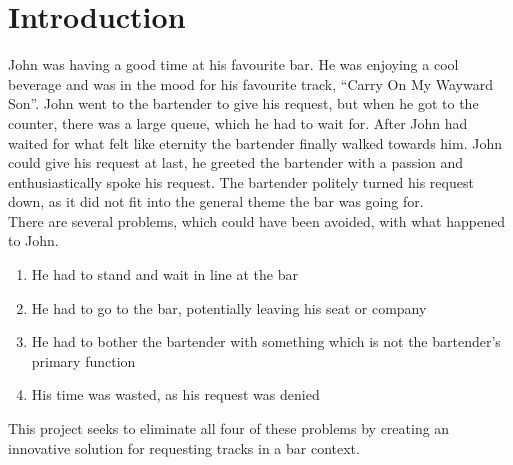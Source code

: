 \chapter{Introduction}
John was having a good time at his favourite bar. He was enjoying a cool beverage and was in the mood for his favourite track, \enquote{Carry On My Wayward Son}. John went to the bartender to give his request, but when he got to the counter, there was a large queue, which he had to wait for. After John had waited for what felt like eternity the bartender finally walked towards him. John could give his request at last, he greeted the bartender with a passion and enthusiastically spoke his request. The bartender politely turned his request down, as it did not fit into the general theme the bar was going for.\\

There are several problems, which could have been avoided, with what happened to John.
\begin{enumerate}
	\item He had to stand and wait in line at the bar
	\item He had to go to the bar, potentially leaving his seat or company
	\item He had to bother the bartender with something which is not the bartender's primary function
	\item His time was wasted, as his request was denied
\end{enumerate}
This project seeks to eliminate all four of these problems by creating an innovative solution for requesting tracks in a bar context.


